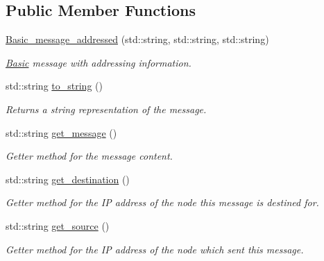 \subsection*{Public Member Functions}
\begin{DoxyCompactItemize}
\item 
\hyperlink{class_basic__message__addressed_a5c7a55bcaf411c56152cd8b0e0f11929}{Basic\+\_\+message\+\_\+addressed} (std\+::string, std\+::string, std\+::string)\hypertarget{class_basic__message__addressed_a5c7a55bcaf411c56152cd8b0e0f11929}{}\label{class_basic__message__addressed_a5c7a55bcaf411c56152cd8b0e0f11929}

\begin{DoxyCompactList}\small\item\em \hyperlink{class_basic}{Basic} message with addressing information. \end{DoxyCompactList}\item 
std\+::string \hyperlink{class_basic__message__addressed_a52fac87b24ea958f475ee573613fbbf0}{to\+\_\+string} ()\hypertarget{class_basic__message__addressed_a52fac87b24ea958f475ee573613fbbf0}{}\label{class_basic__message__addressed_a52fac87b24ea958f475ee573613fbbf0}

\begin{DoxyCompactList}\small\item\em Returns a string representation of the message. \end{DoxyCompactList}\item 
std\+::string \hyperlink{class_basic__message__addressed_a5baee82e6ce16d7c1efb631c9ada7189}{get\+\_\+message} ()\hypertarget{class_basic__message__addressed_a5baee82e6ce16d7c1efb631c9ada7189}{}\label{class_basic__message__addressed_a5baee82e6ce16d7c1efb631c9ada7189}

\begin{DoxyCompactList}\small\item\em Getter method for the message content. \end{DoxyCompactList}\item 
std\+::string \hyperlink{class_basic__message__addressed_aa6ecbe8903236c1048f84d142d68a637}{get\+\_\+destination} ()\hypertarget{class_basic__message__addressed_aa6ecbe8903236c1048f84d142d68a637}{}\label{class_basic__message__addressed_aa6ecbe8903236c1048f84d142d68a637}

\begin{DoxyCompactList}\small\item\em Getter method for the IP address of the node this message is destined for. \end{DoxyCompactList}\item 
std\+::string \hyperlink{class_basic__message__addressed_abedc94bfc1d681916eff93af24e17788}{get\+\_\+source} ()\hypertarget{class_basic__message__addressed_abedc94bfc1d681916eff93af24e17788}{}\label{class_basic__message__addressed_abedc94bfc1d681916eff93af24e17788}

\begin{DoxyCompactList}\small\item\em Getter method for the IP address of the node which sent this message. \end{DoxyCompactList}\end{DoxyCompactItemize}

